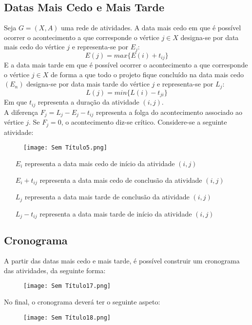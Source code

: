 \documentclass[10pt,a4paper]{report}
\begin{document}
\section{Datas Mais Cedo e Mais Tarde}
Seja $G = (X,A)$ uma rede de atividades. A data mais cedo em que é
possível ocorrer o acontecimento a que corresponde o vértice $j \in X$
designa-se por data mais cedo do vértice $j$ e representa-se por $E_j$:
$$
E (j) = max \{E(i) + t_{ij}\}
$$
E a data mais tarde em que é possível ocorrer o acontecimento a que corresponde o vértice $j \in X$ de forma a que todo o projeto fique concluído na data mais cedo $(E_n)$ designa-se por data mais tarde do vértice $j$ e representa-se por $L_j$:
$$
L (j) = min \{L(i) - t_{ji}\}
$$
Em que $t_{ij}$ representa a duração da atividade $(i,j)$.\\
A diferença $F_j = L_j - E_j - t_{ij}$ representa a folga do acontecimento associado ao vértice $j$. Se $F_j = 0$, o acontecimento diz-se crítico.
Considere-se a seguinte atividade:
\begin{figure}[H]
\centering
\texttt{[image: Sem Título5.png]}
\end{figure}
\begin{itemize}
\item[$E_i$] representa a data mais cedo de início da atividade $(i,j)$
\item[$E_i + t_{ij}$] representa a data mais cedo de conclusão da atividade $(i,j)$
\item[$L_j$] representa a data mais tarde de conclusão da atividade $(i,j)$
\item[$L_j - t_{ij}$] representa a data mais tarde de início da atividade $(i,j)$
\end{itemize}
\section{Cronograma}
A partir das datas mais cedo e mais tarde, é possível construir um cronograma das atividades, da seguinte forma:
\begin{figure}[H]
\centering
\texttt{[image: Sem Título17.png]}
\end{figure}
No final, o cronograma deverá ter o seguinte aspeto:
\begin{figure}[H]
\centering
\texttt{[image: Sem Título18.png]}
\end{figure}

\chapter{}
\end{document}
